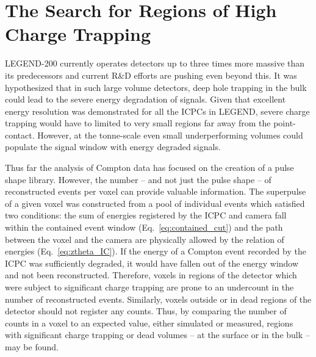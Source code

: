 \chapter{The Search for Regions of High Charge Trapping}\label{chap:trapping}

LEGEND-200 currently operates detectors up to three times more massive than its predecessors and current R\&D efforts are pushing even beyond this. It was hypothesized that in such large volume detectors, deep hole trapping in the bulk could lead to the severe energy degradation of signals. Given that excellent energy resolution was demonstrated for all the ICPCs in LEGEND, severe charge trapping would have to limited to very small regions far away from the point-contact. However, at the tonne-scale even small underperforming volumes could populate the signal window with energy degraded signals.

Thus far the analysis of Compton data has focused on the creation of a pulse shape library. However, the number -- and not just the pulse shape -- of reconstructed events per voxel can provide valuable information. The superpulse of a given voxel was constructed from a pool of individual events which satisfied two conditions: the sum of energies registered by the ICPC and camera fall within the contained event window (Eq.~\ref{eq:contained_cut}) and the path between the voxel and the camera are physically allowed by the relation of energies (Eq.~\ref{eq:ztheta_IC}). If the energy of a Compton event recorded by the ICPC was sufficiently degraded, it would have fallen out of the energy window and not been reconstructed. Therefore, voxels in regions of the detector which were subject to significant charge trapping are prone to an undercount in the number of reconstructed events. Similarly, voxels outside or in dead regions of the detector should not register any counts. Thus, by comparing the number of counts in a voxel to an expected value, either simulated or measured, regions with significant charge trapping or dead volumes -- at the surface or in the bulk -- may be found. 

